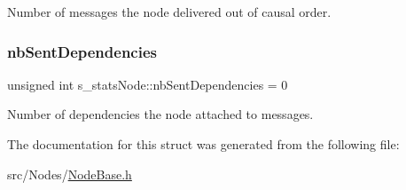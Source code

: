 Number of messages the node delivered out of causal order. 

\mbox{\label{structs__stats_node_af01c78389a27c9eeff8033f6b3d3beee}} 
\subsubsection{\texorpdfstring{nb\+Sent\+Dependencies}{nbSentDependencies}}
{\footnotesize\ttfamily unsigned int s\+\_\+stats\+Node\+::nb\+Sent\+Dependencies = 0}



Number of dependencies the node attached to messages. 



The documentation for this struct was generated from the following file\+:\begin{DoxyCompactItemize}
\item 
src/\+Nodes/\hyperlink{_node_base_8h}{Node\+Base.\+h}\end{DoxyCompactItemize}
